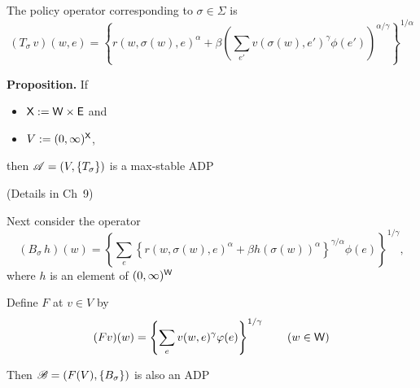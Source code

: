 \documentclass[dvipsnames]{beamer}
\begin{document}
\begin{frame}
    
    The policy operator corresponding to $\sigma \in \Sigma$ is
    \begin{equation*}
        (T_\sigma \, v)(w, e) = 
            \left\{
                r(w, \sigma(w), e)^\alpha + \beta 
                \left( \sum_{e'} v(\sigma(w), e')^\gamma \phi(e') \right)^{\alpha/ \gamma}
            \right\}^{1/\alpha}
    \end{equation*}

            \vspace{0.5em}
            \vspace{0.5em}
    {\bf Proposition.} If 
    \begin{itemize}
        \item $\mathsf X := \mathsf W \times \mathsf E$ and 
        \item $V := (0, \infty)^\mathsf X$, 
    \end{itemize}
    then $\mathscr A = (V, \{T_\sigma\})$ is a max-stable ADP


    (Details in Ch~9)

\end{frame}


\begin{frame}
    
Next consider the operator
%
\begin{equation*}
    (B_\sigma \, h)(w) = 
        \left\{
            \sum_e
            \left\{ 
                r(w, \sigma(w), e)^\alpha + \beta h(\sigma(w))^\alpha
            \right\}^{\gamma/\alpha}
             \phi(e)
        \right\}^{1/\gamma},
\end{equation*}
%
where $h$ is an element of $(0, \infty)^\mathsf W$

            \vspace{0.5em}
            \vspace{0.5em}
Define $F$ at $v \in V$ by
%
\begin{equation*}
    (Fv)(w) = \left\{ \sum_{e} v(w, e)^\gamma \varphi(e) \right\}^{1/\gamma}
        \qquad (w \in \mathsf W)
\end{equation*}
%
            \vspace{0.5em}
            \vspace{0.5em}

Then $\mathscr B = (F(V), \{B_\sigma\})$ is also an ADP

\end{frame}
\end{document}
